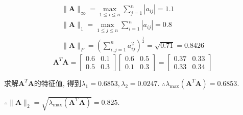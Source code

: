 \documentclass[a4paper]{article}
\begin{document}
\begin{equation}
    \begin{array}{l}\|\boldsymbol{A}\|_{\infty}=\max _{1 \leqslant i \leqslant n} \sum_{j=1}^{n}\left|a_{i j}\right|=1.1 \\ \|\boldsymbol{A}\|_{1}=\max _{1 \leqslant j \leqslant n} \sum_{i=1}^{n}\left|a_{i j}\right|=0.8 \\ \|\boldsymbol{A}\|_{F}=\left(\sum_{i, j=1}^{n} a_{i j}^{2}\right)^{\frac{1}{2}}=\sqrt{0.71}=0.8426\end{array} \nonumber
\end{equation}
\begin{equation}
    \boldsymbol{A}^{T} \boldsymbol{A}=\left[\begin{array}{ll}0.6 & 0.1 \\ 0.5 & 0.3\end{array}\right]\left[\begin{array}{ll}0.6 & 0.5 \\ 0.1 & 0.3\end{array}\right]=\left[\begin{array}{ll}0.37 & 0.33 \\ 0.33 & 0.34\end{array}\right] \nonumber
\end{equation} \par
求解$\boldsymbol{A}^{T} \boldsymbol{A}$的特征值, 得到$\lambda_1 = 0.6853, \lambda_2 = 0.0247$. $\therefore \lambda_{\max}(\boldsymbol{A}^{T}\boldsymbol{A}) = 0.6853$. \par
$\therefore \|\boldsymbol{A}\|_{2}=\sqrt{\lambda_{\max }\left(\boldsymbol{A}^{\mathrm{T}} \boldsymbol{A}\right)}=0.825$.
\end{document}
